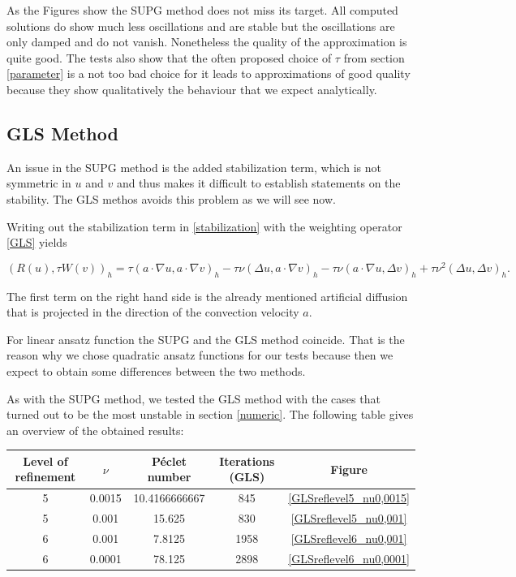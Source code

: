 \documentclass[a4paper, 11pt, twoside]{article}
\begin{document}
As the Figures show the SUPG method does not miss its target. All computed solutions do show much less oscillations and are stable but the oscillations are only damped and do not vanish. Nonetheless the quality of the approximation is quite good. The tests also show that the often proposed choice of $\tau$ from section \ref{parameter} is a not too bad choice for it leads to approximations of good quality because they show qualitatively the behaviour that we expect analytically.


\subsection{GLS Method}

An issue in the SUPG method is the added stabilization term, which is not symmetric in $u$ and $v$ and thus makes it difficult to establish statements on the stability. The GLS methos avoids this problem as we will see now.

Writing out the stabilization term in \eqref{stabilization} with the weighting operator \eqref{GLS} yields

	\[\left(R(u), \tau W(v)\right)_{h} = \tau(a \cdot \nabla u, a \cdot \nabla v)_{h} - \tau\nu(\Delta u, a \cdot \nabla v)_{h} - \tau\nu(a \cdot \nabla u, \Delta v)_{h} + \tau\nu^{2}(\Delta u, \Delta v)_{h}.\]
	
The first term on the right hand side is the already mentioned artificial diffusion that is projected in the direction of the convection velocity $a$.

For linear ansatz function the SUPG and the GLS method coincide. That is the reason why we chose quadratic ansatz functions for our tests because then we expect to obtain some differences between the two methods.

As with the SUPG method, we tested the GLS method with the cases that turned out to be the most unstable in section \ref{numeric}. The following table gives an overview of the obtained results:

\begin{center}
\begin{tabular}{c|c|c|c|c}
\textbf{Level of refinement} & $\nu$ & \textbf{P\'{e}clet number} & \textbf{Iterations (GLS)} & \textbf{Figure} \\ \hline\hline
5 & 0.0015 & 10.4166666667	& 845 & \ref{GLSreflevel5_nu0,0015} \\
5 & 0.001 & 15.625	& 830 & \ref{GLSreflevel5_nu0,001} \\ \hline
6 & 0.001 & 7.8125	& 1958 & \ref{GLSreflevel6_nu0,001} \\
6 & 0.0001 & 78.125 & 2898 & \ref{GLSreflevel6_nu0,0001}
\end{tabular}
\end{center}
\end{document}
